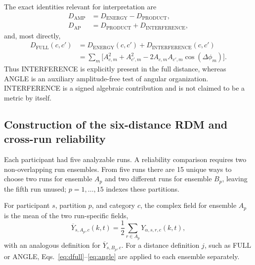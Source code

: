 \documentclass[11pt]{article}
\newcommand{\DFULL}{D_{\mathrm{FULL}}}
\newcommand{\DAP}{D_{\mathrm{AP}}}
\newcommand{\DAMP}{D_{\mathrm{AMP}}}
\newcommand{\DINT}{D_{\mathrm{INTERFERENCE}}}
\begin{document}
The exact identities relevant for interpretation are
\begin{align}
\DAMP&=D_{\mathrm{ENERGY}}-D_{\mathrm{PRODUCT}},\\
\DAP&=D_{\mathrm{PRODUCT}}+\DINT,
\end{align}
and, most directly,
\begin{align}
\DFULL(c,c')
&=D_{\mathrm{ENERGY}}(c,c')+\DINT(c,c')\\
&=\sum_m\Big[A_{c,m}^2+A_{c',m}^2
-2A_{c,m}A_{c',m}\cos(\Delta\phi_m)\Big].
\label{eq:fullenergyint}
\end{align}
Thus INTERFERENCE is explicitly present in the full distance, whereas ANGLE is an auxiliary amplitude-free test of angular organization. INTERFERENCE is a signed algebraic contribution and is not claimed to be a metric by itself.

\subsection{Construction of the six-distance RDM and cross-run reliability}
Each participant had five analyzable runs. A reliability comparison requires two non-overlapping run ensembles. From five runs there are 15 unique ways to choose two runs for ensemble $A_p$ and two different runs for ensemble $B_p$, leaving the fifth run unused; $p=1,\ldots,15$ indexes these partitions.

For participant $s$, partition $p$, and category $c$, the complex field for ensemble $A_p$ is the mean of the two run-specific fields,
\begin{equation}
\overline{Y}_{s,A_p,c}(k,t)=\frac{1}{2}\sum_{r\in A_p}Y_{\alpha,s,r,c}(k,t),
\label{eq:halfmean}
\end{equation}
with an analogous definition for $\overline{Y}_{s,B_p,c}$. For a distance definition $j$, such as FULL or ANGLE, Eqs.~\ref{eq:dfull}--\ref{eq:angle} are applied to each ensemble separately.
\end{document}
